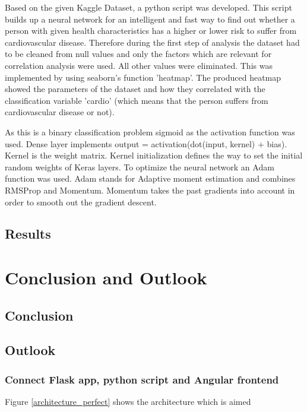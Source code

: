 Based on the given Kaggle Dataset, a python script was developed. This script builds up a neural network for an intelligent and fast way to find out whether a person with given health characteristics has a higher or lower risk to suffer from cardiovascular disease.
Therefore during the first step of analysis the dataset had to be cleaned from null values and only the factors which are relevant for correlation analysis were used. All other values were eliminated. This was implemented by using seaborn's function 'heatmap'. The produced heatmap showed the parameters of the dataset and how they correlated with the classification variable 'cardio' (which means that the person suffers from cardiovascular disease or not).

As this is a binary classification problem sigmoid as the activation function was used.
Dense layer implements output = activation(dot(input, kernel) + bias). Kernel is the weight matrix. Kernel initialization defines the way to set the initial random weights of Keras layers.
To optimize the neural network an Adam function was used. Adam stands for Adaptive moment estimation and combines RMSProp and Momentum. Momentum takes the past gradients into account in order to smooth out the gradient descent.

\section{Results}

\chapter{Conclusion and Outlook }
\section{Conclusion}

\section{Outlook}


\subsection{Connect Flask app, python script and Angular frontend}

Figure \ref{architecture_perfect} shows the architecture which is aimed  

